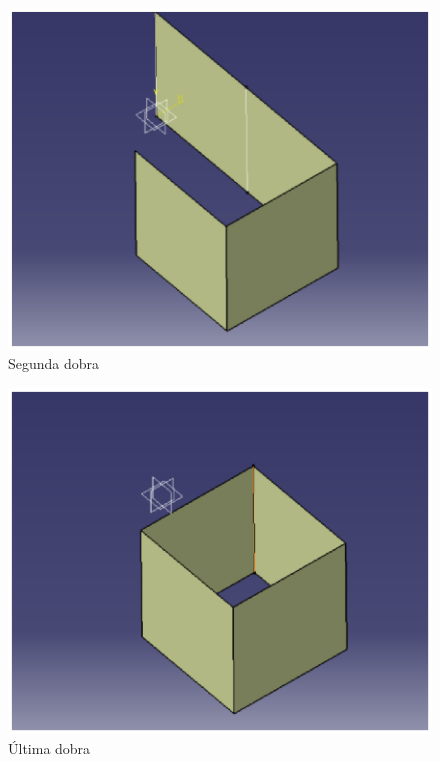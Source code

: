 \begin{figure}[H]
 \centering
   \includegraphics[keepaspectratio=true,scale=0.8]{figuras/estrutura14.eps}
 \caption{Segunda dobra}
 \label{estrutura14}
\end{figure}
\begin{figure}[H]
 \centering
   \includegraphics[keepaspectratio=true,scale=0.8]{figuras/estrutura15.eps}
 \caption{Última dobra}
 \label{estrutura15}
\end{figure}


